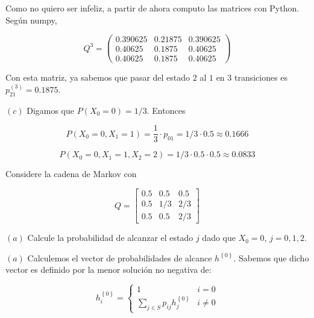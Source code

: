 \documentclass[a4paper, 12pt]{article}
\begin{document}
Como no quiero ser infeliz, a partir de ahora computo las matrices con Python.
Según numpy, 

\begin{equation*}
    Q^3 = \begin{pmatrix}
0.390625 &0.21875  &0.390625\\ 
 0.40625  &0.1875   &0.40625\\ 
 0.40625  &0.1875   &0.40625
    \end{pmatrix} 
\end{equation*}

Con esta matriz, ya sabemos que pasar del estado $2$ al $1$ en $3$ transiciones
es $p_{21}^{(3)} = 0.1875$.

$(c)$ Digamos que $P(X_0 = 0) = 1 / 3$. Entonces 

\begin{equation*}
    P(X_0 = 0, X_1 = 1) = \frac{1}{3} \cdot p_{01} = 1 / 3 \cdot 0.5 \approx
    0.1666 
\end{equation*}

\begin{equation*}
    P(X_0 = 0, X_1 = 1, X_2 = 2) = 1 / 3 \cdot 0.5 \cdot 0.5 \approx 0.0833
\end{equation*}

\pagebreak 

\begin{myframe}
    Considere la cadena de Markov con 

    \begin{equation*}
        Q = \begin{bmatrix} 
            0.5 & 0.5 & 0.5 \\ 
            0.5 & 1 / 3 & 2 / 3 \\ 
            0.5 & 0.5 & 2 / 3
        \end{bmatrix} 
    \end{equation*}

    $(a)$ Calcule la probabilidad de alcanzar el estado $j$ dado que $X_0 = 0$,
    $j = 0, 1, 2$.
\end{myframe}

$(a)$ Calculemos el vector de probabilidades de alcance $h^{\left\{ 0 \right\} }$. Sabemos que
dicho vector es definido por la menor solución no negativa de:

\begin{equation*}
    h_i^{\left\{ 0 \right\} } = \begin{cases}
        1 & i = 0 \\ 
        \sum_{j \in S} p_{ij} h_j^{\left\{ 0 \right\} } & i \neq 0
    \end{cases}
\end{equation*}
\end{document}
